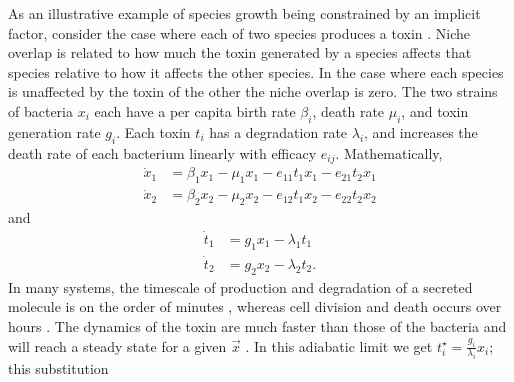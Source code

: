 \documentclass[a4paper,10pt]{article}
\numberwithin{equation}{section} %
\begin{document}
As an illustrative example of species growth being constrained by an implicit factor,
 consider the case where each of two species produces a toxin \cite{VanMelderen2009}. %
Niche overlap is related to how much the toxin generated by a species affects that species relative to how it affects the other species. 
In the case where each species is unaffected by the toxin of the other the niche overlap is zero. 
The two strains of bacteria $x_i$ each have a per capita birth rate $\beta_i$, death rate $\mu_i$, and toxin generation rate $g_i$. %
Each toxin $t_i$ has a degradation rate $\lambda_i$, and increases the death rate of each bacterium linearly with efficacy $e_{ij}$. 
Mathematically, 
\begin{align*}
 \dot{x}_1 &= \beta_1 x_1 - \mu_1 x_1 - e_{11} t_1 x_1 - e_{21} t_2 x_1 \\
 \dot{x}_2 &= \beta_2 x_2 - \mu_2 x_2 - e_{12} t_1 x_2 - e_{22} t_2 x_2
\end{align*}
and
\begin{align*}
 \dot{t}_1 &= g_1 x_1 - \lambda_1 t_1 \\
 \dot{t}_2 &= g_2 x_2 - \lambda_2 t_2.
\end{align*}%
In many systems, the timescale of production and degradation of a secreted molecule is on the order of minutes \cite{??}, whereas cell division and death occurs over hours \cite{??}. 
The dynamics of the toxin are much faster than those of the bacteria and will reach a steady state for a given $\vec{x}$ \cite{adiabatic}. %
In this adiabatic limit we get $t_i^\star = \frac{g_i}{\lambda_i}x_i$; this substitution
\end{document}
